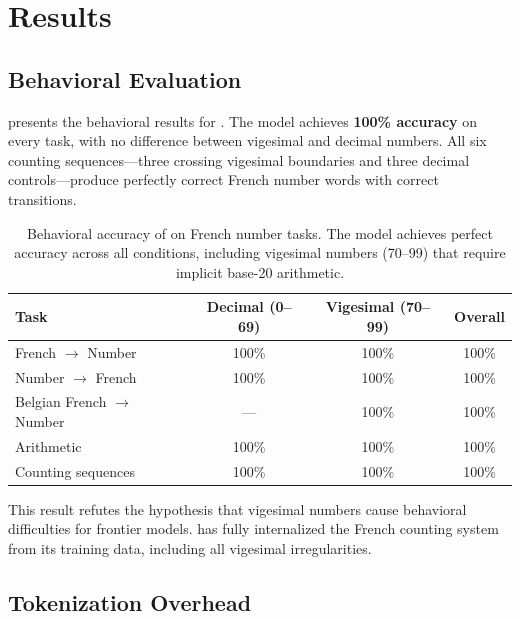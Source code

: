 \section{Results}
\label{sec:results}

\subsection{Behavioral Evaluation}
\label{sec:results_behavioral}

 presents the behavioral results for \gptmodel.
The model achieves \textbf{100\% accuracy} on every task, with no difference between vigesimal and decimal numbers.
All six counting sequences---three crossing vigesimal boundaries and three decimal controls---produce perfectly correct French number words with correct transitions.

\begin{table}[t]
    \centering
    \caption{Behavioral accuracy of \gptmodel on French number tasks. The model achieves perfect accuracy across all conditions, including vigesimal numbers (70--99) that require implicit base-20 arithmetic.}
    \begin{tabular}{@{}lccc@{}}
        \toprule
        \textbf{Task} & \textbf{Decimal (0--69)} & \textbf{Vigesimal (70--99)} & \textbf{Overall} \\
        \midrule
        French $\to$ Number & 100\% & 100\% & 100\% \\
        Number $\to$ French & 100\% & 100\% & 100\% \\
        Belgian French $\to$ Number & --- & 100\% & 100\% \\
        Arithmetic & 100\% & 100\% & 100\% \\
        Counting sequences & 100\% & 100\% & 100\% \\
        \bottomrule
    \end{tabular}
    \label{tab:behavioral}
\end{table}

This result refutes the hypothesis that vigesimal numbers cause behavioral difficulties for frontier models.
\gptmodel has fully internalized the French counting system from its training data, including all vigesimal irregularities.

\subsection{Tokenization Overhead}
\label{sec:results_tokens}

